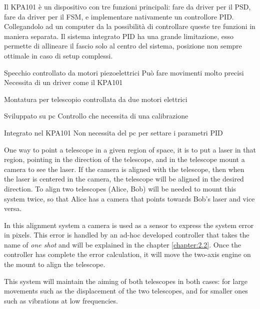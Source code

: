 Il KPA101 è un dispositivo con tre funzioni principali: fare da driver per il PSD, fare da driver per il FSM, e implementare nativamente un controllore PID. Collegandolo ad un computer da la possibilità di controllare queste tre funzioni in maniera separata. Il sistema integrato PID ha una grande limitazione, esso permette di allineare il fascio solo al centro del sistema, posizione non sempre ottimale in caso di setup complessi.


Specchio controllato da motori piezoelettrici
Può fare movimenti molto precisi
Necessita di un driver come il KPA101

Montatura per telescopio controllata da due motori elettrici

Sviluppato su pc
Controllo che necessita di una calibrazione

Integrato nel KPA101
Non necessita del pc per settare i parametri PID

One way to point a telescope in a given region of space, it is to put a laser in that region, pointing in the direction of the telescope, and in the telescope mount a camera to see the laser.
If the camera is aligned with the telescope, then when the laser is centered in the camera, the telescope will be aligned in the desired direction.
To align two telescopes (Alice, Bob) will be needed to mount this system twice, so that Alice has a camera that points towards Bob’s laser and vice versa.

In this alignment system a camera is used as a sensor to express the system error in pixels. This error is handled by an ad-hoc developed controller that takes the name of \textit{one shot} and will be explained in the chapter \ref{chapter:2.2}. Once the controller has complete the error calculation, it will move the two-axis engine on the mount to align the telescope.

This system will maintain the aiming of both telescopes in both cases: for large movements such as the displacement of the two telescopes, and for smaller ones such as vibrations at low frequencies.



